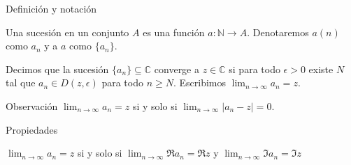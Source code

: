 \documentclass[spanish,presentation]{beamer}
\begin{document}
\begin{frame}[label=sec-2-1]{Definición y notación}
\begin{definition}[Sucesión]
Una \alert{sucesión} en un conjunto \(A\) es una función
\(a\colon\mathbb{N}\to A\). Denotaremos \(a(n)\) como \(a_{n}\) y
a \(a\) como \(\{a_{n}\}\).
\end{definition}

\begin{definition}[Convergencia]
Decimos que la sucesión \(\{a_{n}\}\subseteq \mathbb{C}\) \alert{converge}
a \(z\in\mathbb{C}\) si para todo \(\epsilon>0\) existe \(N\) tal
que \(a_{n}\in D(z,\epsilon)\) para todo \(n\geq N\). Escribimos
\(\lim_{n\to\infty}a_{n}=z\). 
\end{definition}

\begin{block}{Observación}
\(\lim_{n\to\infty}a_{n}=z\) si y solo si \(\lim_{n\to\infty}|a_{n}-z|=0\).
\end{block}
\end{frame}

\begin{frame}[label=sec-2-2]{Propiedades}
\begin{theorem}
\(\lim_{n\to\infty}a_{n}=z\) si y solo si \(\lim_{n\to\infty}\Re
    a_{n}=\Re z\) y \(\lim_{n\to\infty}\Im a_{n}=\Im z\)
\end{theorem}
\end{frame}
\end{document}

